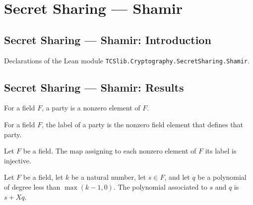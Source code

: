 \section{Secret Sharing --- Shamir}
\subsection*{Secret Sharing --- Shamir: Introduction}

Declarations of the Lean module \texttt{TCSlib.Cryptography.SecretSharing.Shamir}.

\subsection*{Secret Sharing --- Shamir: Results}

\begin{definition}
\label{TCSlib.Shamir.Party}
\leanok
For a field $F$, a party is a nonzero element of $F$.
\end{definition}

\begin{definition}
\label{TCSlib.Shamir.label}
\leanok
{}
For a field $F$, the label of a party is the nonzero field element that defines that
party.
\end{definition}

\begin{theorem}
\label{TCSlib.Shamir.label_injective}
\leanok
{}
Let $F$ be a field. The map assigning to each nonzero element of $F$ its label is
injective.
\end{theorem}

\begin{definition}
\label{TCSlib.Shamir.poly}
\leanok
Let $F$ be a field, let $k$ be a natural number, let $s\in F$, and let $q$ be a
polynomial of degree less than $\max(k-1,0)$. The polynomial associated to $s$ and $q$
is $s+Xq$.
\end{definition}

